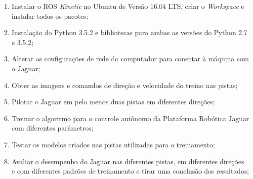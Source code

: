 \begin{enumerate}
\item Instalar o ROS \textit{Kinetic} no Ubuntu de Versão 16.04 LTS, criar o \textit{Workspace} e instalar todos os pacotes;
\item Instalação do Python 3.5.2 e bibliotecas para ambas as versões do Python 2.7 e 3.5.2;
\item Alterar as configurações de rede do computador para conectar à máquina com o Jaguar;
\item Obter as imagens e comandos de direção e velocidade do treino nas pistas;
\item Pilotar o Jaguar em pelo menos duas pistas em diferentes direções;
\item Treinar o algoritmo para o controle autônomo da Plataforma Robótica Jaguar com diferentes parâmetros;
\item Testar os modelos criados nas pistas utilizadas para o treinamento;
\item Avaliar o desempenho do Jaguar nas diferentes pistas, em diferentes direções e com diferentes padrões de treinamento e tirar uma conclusão dos resultados;
\end{enumerate}